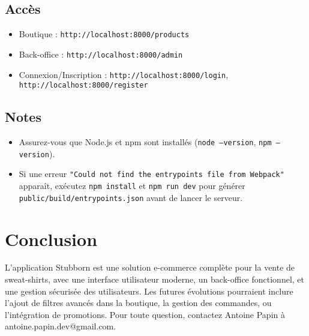 \documentclass[a4paper,11pt]{article}
\begin{document}
\subsection{Accès}
\begin{itemize}
    \item Boutique : \texttt{http://localhost:8000/products}
    \item Back-office : \texttt{http://localhost:8000/admin}
    \item Connexion/Inscription : \texttt{http://localhost:8000/login}, \texttt{http://localhost:8000/register}
\end{itemize}

\subsection{Notes}
\begin{itemize}
    \item Assurez-vous que Node.js et npm sont installés (\texttt{node --version}, \texttt{npm --version}).
    \item Si une erreur \texttt{"Could not find the entrypoints file from Webpack"} apparaît, exécutez \texttt{npm install} et \texttt{npm run dev} pour générer \texttt{public/build/entrypoints.json} avant de lancer le serveur.
\end{itemize}

\section{Conclusion}
L'application Stubborn est une solution e-commerce complète pour la vente de sweat-shirts, avec une interface utilisateur moderne, un back-office fonctionnel, et une gestion sécurisée des utilisateurs. Les futures évolutions pourraient inclure l'ajout de filtres avancés dans la boutique, la gestion des commandes, ou l'intégration de promotions. Pour toute question, contactez Antoine Papin à antoine.papin.dev@gmail.com.

\end{document}
